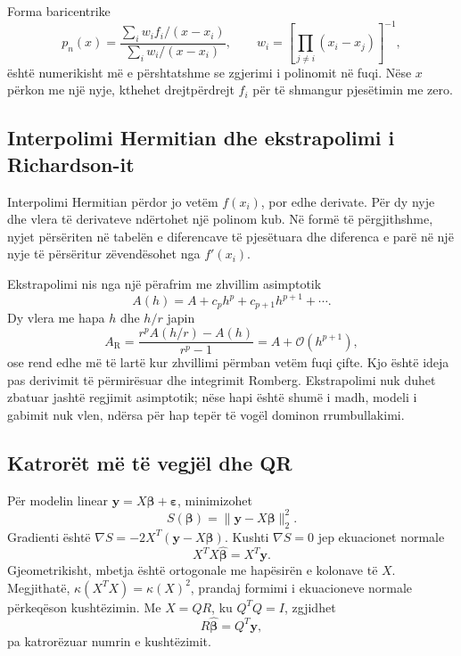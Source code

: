 \documentclass[11pt,oneside,openany]{book}
\newcommand{\vect}[1]{\bm{#1}}
\newcommand{\Oh}{\mathcal{O}}
\begin{document}
Forma baricentrike
\begin{equation}
 p_n(x)=\frac{\sum_i w_i f_i/(x-x_i)}{\sum_i w_i/(x-x_i)},
 \qquad w_i=\left[\prod_{j\ne i}(x_i-x_j)\right]^{-1},
\end{equation}
është numerikisht më e përshtatshme se zgjerimi i polinomit në fuqi. Nëse $x$ përkon me një nyje, kthehet drejtpërdrejt $f_i$ për të shmangur pjesëtimin me zero.

\subsection{Interpolimi Hermitian dhe ekstrapolimi i Richardson-it}
Interpolimi Hermitian përdor jo vetëm $f(x_i)$, por edhe derivate. Për dy nyje dhe vlera të derivateve ndërtohet një polinom kub. Në formë të përgjithshme, nyjet përsëriten në tabelën e diferencave të pjesëtuara dhe diferenca e parë në një nyje të përsëritur zëvendësohet nga $f'(x_i)$.

Ekstrapolimi nis nga një përafrim me zhvillim asimptotik
\begin{equation}
 A(h)=A+c_ph^p+c_{p+1}h^{p+1}+\cdots.
\end{equation}
Dy vlera me hapa $h$ dhe $h/r$ japin
\begin{equation}
 A_{\mathrm{R}}=\frac{r^pA(h/r)-A(h)}{r^p-1}
 =A+\Oh(h^{p+1}),
\end{equation}
ose rend edhe më të lartë kur zhvillimi përmban vetëm fuqi çifte. Kjo është ideja pas derivimit të përmirësuar dhe integrimit Romberg. Ekstrapolimi nuk duhet zbatuar jashtë regjimit asimptotik; nëse hapi është shumë i madh, modeli i gabimit nuk vlen, ndërsa për hap tepër të vogël dominon rrumbullakimi.

\subsection{Katrorët më të vegjël dhe QR}
Për modelin linear $\vect y=X\vect\beta+\vect\varepsilon$, minimizohet
\begin{equation}
 S(\vect\beta)=\|\vect y-X\vect\beta\|_2^2.
\end{equation}
Gradienti është $\nabla S=-2X^T(\vect y-X\vect\beta)$. Kushti $\nabla S=0$ jep ekuacionet normale
\begin{equation}
 X^TX\widehat{\vect\beta}=X^T\vect y.
\end{equation}
Gjeometrikisht, mbetja është ortogonale me hapësirën e kolonave të $X$. Megjithatë, $\kappa(X^TX)=\kappa(X)^2$, prandaj formimi i ekuacioneve normale përkeqëson kushtëzimin. Me $X=QR$, ku $Q^TQ=I$, zgjidhet
\begin{equation}
 R\widehat{\vect\beta}=Q^T\vect y,
\end{equation}
pa katrorëzuar numrin e kushtëzimit.
\end{document}
